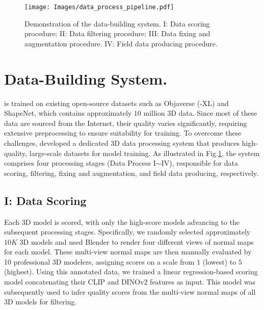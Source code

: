 \begin{figure}[!t]
\centering
\texttt{[image: Images/data\_process\_pipeline.pdf]}
\caption{Demonstration of the \method{} data-building system. I: Data scoring procedure; II: Data filtering procedure; III: Data fixing and augmentation procedure. IV: Field data producing procedure.}
\vspace{-1em}
\label{fig:data_process_pipeline}
\vspace{-1em}
\end{figure}




\section{Data-Building System.}\label{sec:data}
\method{} is trained on existing open-source datasets such as Objaverse (-XL)\cite{deitke2023objaverse, deitke2024objaverse} and ShapeNet\cite{chang2015shapenet}, which contains approximately $10$ million 3D data. Since most of these data are sourced from the Internet, their quality varies significantly, requiring extensive preprocessing to ensure suitability for training.
To overcome these challenges, \method{} developed a dedicated 3D data processing system that produces high-quality, large-scale datasets for model training.
As illustrated in Fig.\ref{fig:data_process_pipeline}, the system comprises four processing stages (Data Process I$\sim$IV), responsible for data scoring, filtering, fixing and augmentation, and field data producing, respectively.

\subsection{I: Data Scoring}
Each 3D model is scored, with only the high-score models advancing to the subsequent processing stages.
Specifically, we randomly selected approximately $10K$ 3D models and used Blender to render four different views of normal maps for each model. These multi-view normal maps are then manually evaluated by 10 professional 3D modelers, assigning scores on a scale from $1$ (lowest) to $5$ (highest).
Using this annotated data, we trained a linear regression-based scoring model concatenating their CLIP\cite{radford2021learning} and DINOv2\cite{oquab2023dinov2} features as input. This model was subsequently used to infer quality scores from the multi-view normal maps of all 3D models for filtering.

